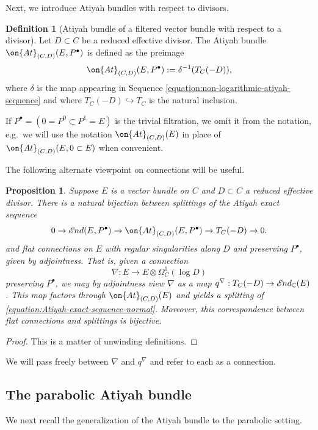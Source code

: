 \documentclass[12 pt]{amsart}
\theoremstyle{plain}
\newtheorem{proposition}[subsubsection]{Proposition}
\theoremstyle{definition}
\newtheorem{definition}[subsubsection]{Definition}
\theoremstyle{remark}
\numberwithin{equation}{section}
\newcommand*{\sheafend}{\mathscr{E}\kern -1pt nd}
\begin{document}
Next, we introduce Atiyah bundles with respect to divisors.
\begin{definition}[Atiyah bundle of a filtered vector bundle with respect to a divisor]
	\label{definition:atiyah-bundle-divisor}
Let $D\subset C$ be a reduced effective divisor.
The Atiyah bundle $\on{At}_{(C,D)}(E,P^\bullet)$ is defined as the preimage 
$$\on{At}_{(C,D)}(E,P^\bullet):=\delta^{-1}(T_C(-D)),$$ where $\delta$ is the map appearing in Sequence \eqref{equation:non-logarithmic-atiyah-sequence} and where $T_C(-D)\hookrightarrow T_C$ is the natural inclusion. 

If $P^\bullet = (0 = P^0 \subset P^1 = E)$ is the trivial filtration, we omit it from the notation, e.g.~we will use the notation $\on{At}_{(C,D)}(E)$ 
in place of $\on{At}_{(C,D)}(E, 0 \subset E)$
when convenient.
\end{definition}
The
following alternate viewpoint on connections will be useful.
\begin{proposition}\label{proposition:atiyah-splittings}
Suppose $E$ is a vector bundle on $C$ and $D \subset C$ a reduced
effective divisor.
    There is a natural bijection between splittings of the Atiyah exact sequence
    \begin{equation}
	    \label{equation:Atiyah-exact-sequence-normal}
	    0\to \sheafend(E, P^\bullet)\to \on{At}_{(C,D)}(E, P^\bullet)\to T_C(-D)\to
    0.
    \end{equation}
	and flat connections on $E$ with
    regular singularities along $D$ and preserving $P^\bullet$, given by
    adjointness. That is, given a connection $$\nabla: E\to E\otimes
    \Omega^1_C(\log D)$$ preserving $P^\bullet$, we may by adjointness view
    $\nabla$ as a map $q^\nabla: T_C(-D)\to
    \sheafend_{\mathbb{C}}(E)$. 
    This map factors through $\on{At}_{(C,D)}(E)$ and
    yields a splitting of \eqref{equation:Atiyah-exact-sequence-normal}.
    Moreover, this correspondence between flat connections and splittings is bijective.
\end{proposition}
\begin{proof}
    This is a matter of unwinding definitions.
\end{proof}
We will pass freely between $\nabla$ and $q^\nabla$ and refer to each as a connection.
\subsection{The parabolic Atiyah bundle}
\label{subsection:parabolic-atiyah}

We next recall the generalization of the Atiyah bundle to the parabolic setting.
\end{document}
